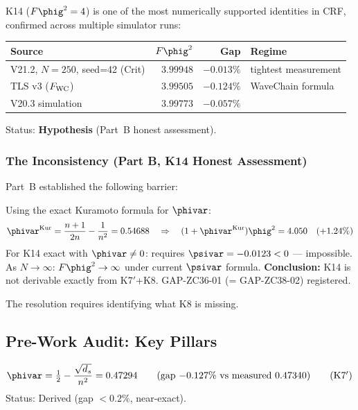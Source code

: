 \documentclass[12pt, a4paper]{article}
\begin{document}
K14 ($F\phig^2 = 4$) is one of the most numerically supported
identities in CRF, confirmed across multiple simulator runs:

\begin{formalbox}[title={K14 History (Part B)}]
\begin{center}
\renewcommand{\arraystretch}{1.2}
\begin{tabular}{lrrl}
\toprule
Source & $F\phig^2$ & Gap & Regime \\
\midrule
V21.2, $N=250$, seed=42 (Crit) & $3.99948$ & $-0.013\%$ & tightest measurement \\
TLS v3 ($F_{\rm WC}$) & $3.99505$ & $-0.124\%$ & WaveChain formula \\
V20.3 simulation & $3.99773$ & $-0.057\%$ & \\
\bottomrule
\end{tabular}
\end{center}
Status: \textbf{Hypothesis} (Part~B honest assessment).
\end{formalbox}

\subsubsection{The Inconsistency (Part B, K14 Honest Assessment)}

Part~B established the following barrier:

\begin{openqbox}[title={Inherited: K14 Algebraic Inconsistency (Part B)}]
Using the exact Kuramoto formula for $\phivar$:
\[
  \phivar^{\rm Kur} = \frac{n+1}{2n} - \frac{1}{n^2} = 0.54688
  \quad\Rightarrow\quad
  (1+\phivar^{\rm Kur})\phig^2 = 4.050 \quad (+1.24\%)
\]
For K14 exact with $\phivar \neq 0$: requires $\psivar = -0.0123 < 0$ --- impossible.
As $N\to\infty$: $F\phig^2\to\infty$ under current $\psivar$ formula.
\textbf{Conclusion:} K14 is not derivable exactly from K7$'$+K8.
GAP-ZC36-01 (= GAP-ZC38-02) registered.
\end{openqbox}

\noindent
The resolution requires identifying what K8 is missing.

\subsection{Pre-Work Audit: Key Pillars}
\label{sec:pwa}

\begin{formalbox}[title={Pillar 1: K7$'$ --- WaveChain $\phivar$ (Part B)}]
\[
  \phivar = \tfrac{1}{2} - \frac{\sqrt{d_s}}{n^2} = 0.47294
  \qquad (\text{gap } {-0.127\%} \text{ vs measured } 0.47340)
  \tag{K7$'$}
\]
Status: Derived (gap $< 0.2\%$, near-exact).
\end{formalbox}
\end{document}

